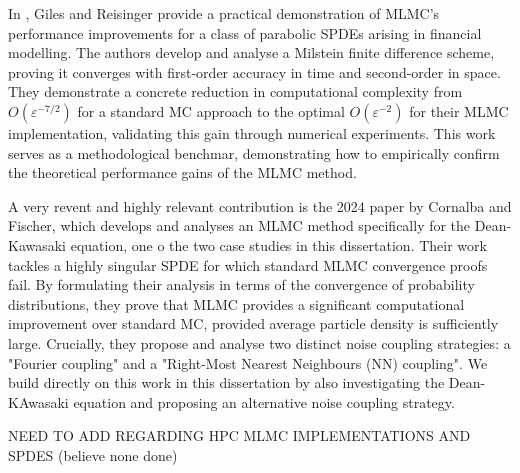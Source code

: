 In \cite{giles2012stochastic}, Giles and Reisinger provide a practical demonstration of 
MLMC's performance improvements for a class of parabolic SPDEs arising in financial modelling. 
The authors develop and analyse a Milstein finite difference scheme, proving it converges with 
first-order accuracy in time and second-order in space. They demonstrate a concrete reduction
in computational complexity from $O(\varepsilon^{-7/2})$ for a standard MC approach to the optimal 
$O(\varepsilon^{-2})$ for their MLMC implementation, validating this gain through 
numerical experiments. This work serves as a methodological benchmar, demonstrating how to 
empirically confirm the theoretical performance gains of the MLMC method.

A very revent and highly relevant contribution is the 2024 paper by 
Cornalba and Fischer, which 
develops and analyses an MLMC method specifically for the Dean-Kawasaki equation, 
one o the two case studies in this dissertation. Their work tackles a highly singular SPDE 
for which standard MLMC convergence proofs fail. By formulating their analysis in terms 
of the convergence of probability distributions, they prove that MLMC provides a 
significant computational improvement over standard MC, provided average 
particle density is sufficiently large. Crucially, they propose and 
analyse two distinct noise coupling strategies:
a "Fourier coupling" and a "Right-Most Nearest Neighbours (NN) coupling". We build directly
on this work in this dissertation by also investigating the Dean-KAwasaki equation and proposing 
an alternative noise coupling strategy.

NEED TO ADD REGARDING HPC MLMC IMPLEMENTATIONS AND SPDES (believe none done)




